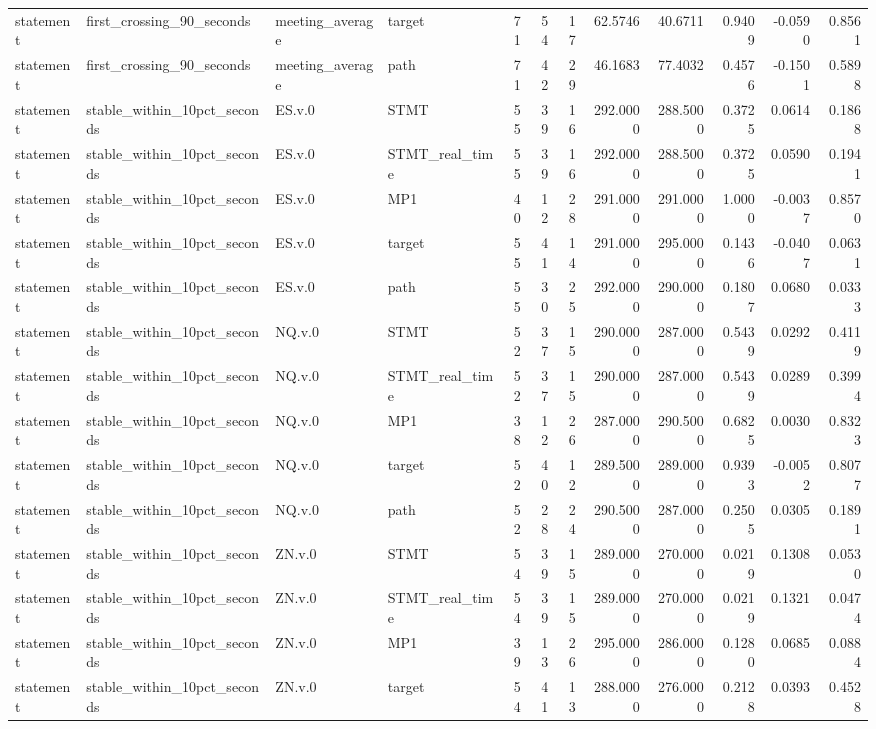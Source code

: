 \begin{tabular}{llllrrrrrrrr}
statement & first_crossing_90_seconds & meeting_average & target & 71 & 54 & 17 & 62.5746 & 40.6711 & 0.9409 & -0.0590 & 0.8561 \\
statement & first_crossing_90_seconds & meeting_average & path & 71 & 42 & 29 & 46.1683 & 77.4032 & 0.4576 & -0.1501 & 0.5898 \\
statement & stable_within_10pct_seconds & ES.v.0 & STMT & 55 & 39 & 16 & 292.0000 & 288.5000 & 0.3725 & 0.0614 & 0.1868 \\
statement & stable_within_10pct_seconds & ES.v.0 & STMT_real_time & 55 & 39 & 16 & 292.0000 & 288.5000 & 0.3725 & 0.0590 & 0.1941 \\
statement & stable_within_10pct_seconds & ES.v.0 & MP1 & 40 & 12 & 28 & 291.0000 & 291.0000 & 1.0000 & -0.0037 & 0.8570 \\
statement & stable_within_10pct_seconds & ES.v.0 & target & 55 & 41 & 14 & 291.0000 & 295.0000 & 0.1436 & -0.0407 & 0.0631 \\
statement & stable_within_10pct_seconds & ES.v.0 & path & 55 & 30 & 25 & 292.0000 & 290.0000 & 0.1807 & 0.0680 & 0.0333 \\
statement & stable_within_10pct_seconds & NQ.v.0 & STMT & 52 & 37 & 15 & 290.0000 & 287.0000 & 0.5439 & 0.0292 & 0.4119 \\
statement & stable_within_10pct_seconds & NQ.v.0 & STMT_real_time & 52 & 37 & 15 & 290.0000 & 287.0000 & 0.5439 & 0.0289 & 0.3994 \\
statement & stable_within_10pct_seconds & NQ.v.0 & MP1 & 38 & 12 & 26 & 287.0000 & 290.5000 & 0.6825 & 0.0030 & 0.8323 \\
statement & stable_within_10pct_seconds & NQ.v.0 & target & 52 & 40 & 12 & 289.5000 & 289.0000 & 0.9393 & -0.0052 & 0.8077 \\
statement & stable_within_10pct_seconds & NQ.v.0 & path & 52 & 28 & 24 & 290.5000 & 287.0000 & 0.2505 & 0.0305 & 0.1891 \\
statement & stable_within_10pct_seconds & ZN.v.0 & STMT & 54 & 39 & 15 & 289.0000 & 270.0000 & 0.0219 & 0.1308 & 0.0530 \\
statement & stable_within_10pct_seconds & ZN.v.0 & STMT_real_time & 54 & 39 & 15 & 289.0000 & 270.0000 & 0.0219 & 0.1321 & 0.0474 \\
statement & stable_within_10pct_seconds & ZN.v.0 & MP1 & 39 & 13 & 26 & 295.0000 & 286.0000 & 0.1280 & 0.0685 & 0.0884 \\
statement & stable_within_10pct_seconds & ZN.v.0 & target & 54 & 41 & 13 & 288.0000 & 276.0000 & 0.2128 & 0.0393 & 0.4528 \\

\end{tabular}
